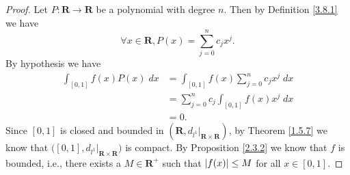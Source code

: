 \begin{proof}
    Let \(P : \mathbf{R} \to \mathbf{R}\) be a polynomial with degree \(n\).
    Then by Definition \ref{3.8.1} we have
    \[
        \forall x \in \mathbf{R}, P(x) = \sum_{j = 0}^n c_j x^j.
    \]
    By hypothesis we have
    \begin{align*}
        \int_{[0, 1]} f(x) P(x) \; dx & = \int_{[0, 1]} f(x) \sum_{j = 0}^n c_j x^j \; dx \\
                                      & = \sum_{j = 0}^n c_j \int_{[0, 1]} f(x) x^j \; dx \\
                                      & = 0.
    \end{align*}
    Since \([0, 1]\) is closed and bounded in \((\mathbf{R}, d_{l^1}|_{\mathbf{R} \times \mathbf{R}})\), by Theorem \ref{1.5.7} we know that \(\big([0, 1], d_{l^1}|_{\mathbf{R} \times \mathbf{R}}\big)\) is compact.
    By Proposition \ref{2.3.2} we know that \(f\) is bounded, i.e., there exists a \(M \in \mathbf{R}^+\) such that \(\abs*{f(x)} \leq M\) for all \(x \in [0, 1]\).


\end{proof}
